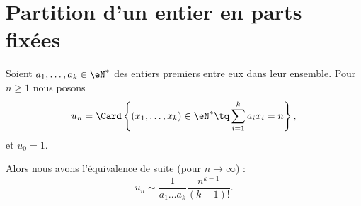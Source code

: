 \section{Partition d'un entier en parts fixées}

\begin{proposition}     \label{PropWUFpuBR}
    Soient \( a_1,\ldots, a_k\in \eN^*\) des entiers premiers entre eux dans leur ensemble. Pour \( n\geq 1\) nous posons
    \begin{equation}
        u_n=\Card\left\{  (x_1,\ldots, x_k)\in \eN^*\tq \sum_{i=1}^ka_ix_i=n \right\},
    \end{equation}
    et \( u_0=1\).

    Alors nous avons l'équivalence de suite (pour \( n\to \infty\)) :
    \begin{equation}
        u_n\sim\frac{1}{ a_1\ldots a_k }\frac{ n^{k-1} }{ (k-1)! }.
    \end{equation}
\end{proposition}

